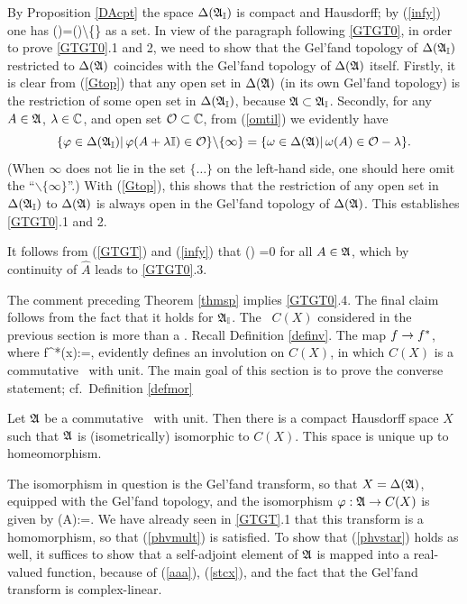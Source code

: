 By Proposition \ref{DAcpt} the space $\Delta({\frak A}_{\Bbb I})$ is compact and
Hausdorff; by (\ref{infy}) one has \be
\Dl(\A)=\Dl(\AI)\backslash\{\infty\} \ee as a set.  In view of the
paragraph following \ref{GTGT0}, in order to prove \ref{GTGT0}.1 and
2, we need to show that the Gel'fand topology of $\Delta({\frak A}_{\Bbb I})$ restricted
to $\Delta({\frak A})$ coincides with the Gel'fand topology of $\Delta({\frak A})$
itself. Firstly, it is clear from (\ref{Gtop}) that any open set in
$\Delta({\frak A})$ (in its own Gel'fand topology) is the restriction of some open
set in $\Delta({\frak A}_{\Bbb I})$, because ${\frak A}\subset{\frak A}_{\Bbb I}$.  Secondly, for any
$A\in{\frak A}$, $\lambda\in{\Bbb C}$, and open set ${\cal O}\subset{\Bbb C}$, from (\ref{omtil})
we evidently have
$$
\{\varphi\in\Delta({\frak A}_{\Bbb I})|\, \varphi(A+\lambda{\Bbb I})\in{\cal O}\}\backslash\{\infty\}=
\{\omega\in\Delta({\frak A})|\, \omega(A)\in {\cal O}-\lambda\}.
$$
(When $\infty$ does not lie in the set $\{\ldots\}$ on the left-hand
side, one should here omit the ``$\backslash\{\infty\}$''.) With
(\ref{Gtop}), this shows that the restriction of any open set in
$\Delta({\frak A}_{\Bbb I})$ to $\Delta({\frak A})$ is always open in the Gel'fand topology of
$\Delta({\frak A})$. This establishes \ref{GTGT0}.1 and 2.

 It follows from (\ref{GTGT}) and (\ref{infy}) that \be
{}(\infty) =0 \ee for all $A\in{\frak A}$, which by continuity of
$\hat{A}$ leads to \ref{GTGT0}.3.

The comment preceding Theorem \ref{thmsp} implies \ref{GTGT0}.4.  The
final claim follows from the fact that it holds for ${\frak A}_{\Bbb I}$.\enp
{} The \BA\ $C(X)$ considered
in the previous section is more than a \BA. Recall Definition
\ref{definv}. The map $f\rightarrow f^*$, where \be f^*(x):=,
 \ee evidently defines an involution on $C(X)$, in which
$C(X)$ is a commutative \ca\ with unit. The main goal of this section
is to prove the converse statement; cf.\ Definition \ref{defmor}
\begin{Theorem} Let ${\frak A}$ be a commutative \ca\ with
unit. Then there is a compact Hausdorff space $X$ such that ${\frak A}$ is
(isometrically) isomorphic to $C(X)$. This space is unique up to
homeomorphism.  \end{Theorem}

The isomorphism in question is the Gel'fand transform, so that
$X=\Delta({\frak A})$, equipped with the Gel'fand topology, and the isomorphism
$\varphi:{\frak A}\rightarrow C(X)$ is given by \be \phv(A):=.  \ee We
have already seen in \ref{GTGT}.1 that this transform is a
homomorphism, so that (\ref{phvmult}) is satisfied. To show that
(\ref{phvstar}) holds as well, it suffices to show that a self-adjoint
element of ${\frak A}$ is mapped into a real-valued function, because of
(\ref{aaa}), (\ref{stcx}), and the fact that the Gel'fand transform is
complex-linear.

